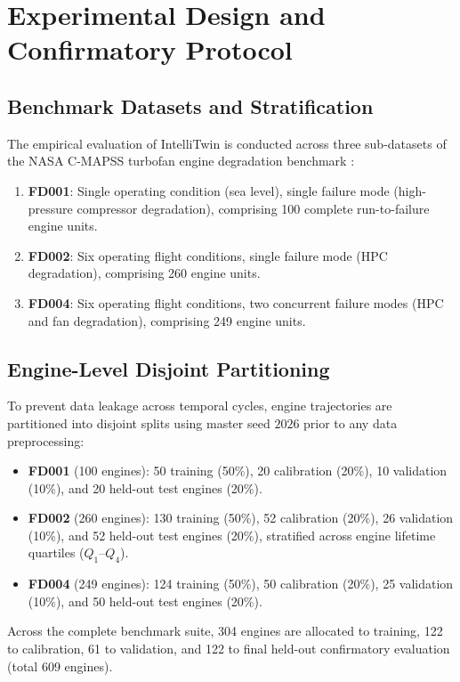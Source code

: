 \chapter{Experimental Design and Confirmatory Protocol}
\label{chap:experimental_design}

\section{Benchmark Datasets and Stratification}
The empirical evaluation of IntelliTwin is conducted across three sub-datasets of the NASA C-MAPSS turbofan engine degradation benchmark \cite{saxena2008damage}:
\begin{enumerate}
    \item \textbf{FD001}: Single operating condition (sea level), single failure mode (high-pressure compressor degradation), comprising 100 complete run-to-failure engine units.
    \item \textbf{FD002}: Six operating flight conditions, single failure mode (HPC degradation), comprising 260 engine units.
    \item \textbf{FD004}: Six operating flight conditions, two concurrent failure modes (HPC and fan degradation), comprising 249 engine units.
\end{enumerate}

\section{Engine-Level Disjoint Partitioning}
To prevent data leakage across temporal cycles, engine trajectories are partitioned into disjoint splits using master seed $2026$ prior to any data preprocessing:
\begin{itemize}
    \item \textbf{FD001} (100 engines): 50 training (50\%), 20 calibration (20\%), 10 validation (10\%), and 20 held-out test engines (20\%).
    \item \textbf{FD002} (260 engines): 130 training (50\%), 52 calibration (20\%), 26 validation (10\%), and 52 held-out test engines (20\%), stratified across engine lifetime quartiles ($Q_1$--$Q_4$).
    \item \textbf{FD004} (249 engines): 124 training (50\%), 50 calibration (20\%), 25 validation (10\%), and 50 held-out test engines (20\%).
\end{itemize}
Across the complete benchmark suite, 304 engines are allocated to training, 122 to calibration, 61 to validation, and 122 to final held-out confirmatory evaluation (total 609 engines).

